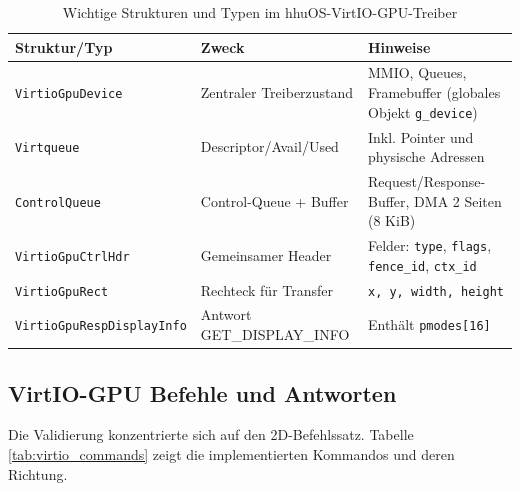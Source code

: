 \begin{table}[ht]
\centering
\caption{Wichtige Strukturen und Typen im hhuOS-VirtIO-GPU-Treiber}
\label{tab:virtio_structures}
\begin{tabular}{l l l}
\toprule
\textbf{Struktur/Typ} & \textbf{Zweck} & \textbf{Hinweise} \\ \midrule
\texttt{VirtioGpuDevice} & Zentraler Treiberzustand & MMIO, Queues, Framebuffer (globales Objekt \texttt{g\_device}) \\
\texttt{Virtqueue} & Descriptor/Avail/Used & Inkl. Pointer und physische Adressen \\
\texttt{ControlQueue} & Control-Queue + Buffer & Request/Response-Buffer, DMA 2 Seiten (8 KiB) \\
\texttt{VirtioGpuCtrlHdr} & Gemeinsamer Header & Felder: \texttt{type}, \texttt{flags}, \texttt{fence\_id}, \texttt{ctx\_id} \\
\texttt{VirtioGpuRect} & Rechteck für Transfer & \texttt{x, y, width, height} \\
\texttt{VirtioGpuRespDisplayInfo} & Antwort GET\_DISPLAY\_INFO & Enthält \texttt{pmodes[16]} \\ \bottomrule
\end{tabular}
\end{table}

\subsection{VirtIO-GPU Befehle und Antworten}

Die Validierung konzentrierte sich auf den 2D-Befehlssatz. Tabelle
\ref{tab:virtio_commands} zeigt die implementierten Kommandos und deren
Richtung.

